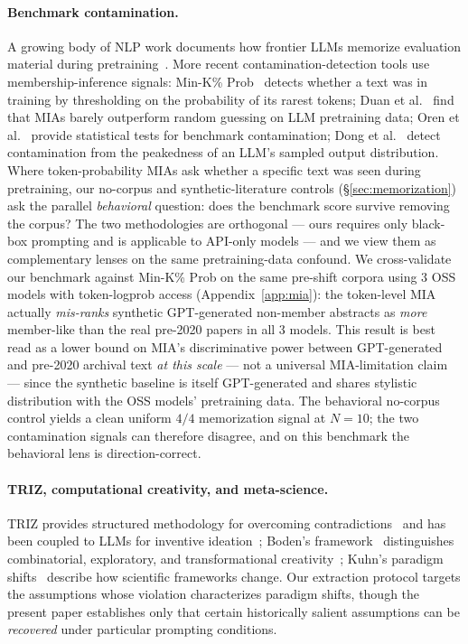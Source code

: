 \documentclass[11pt]{article}
\begin{document}
\paragraph{Benchmark contamination.}
A growing body of NLP work documents how frontier LLMs memorize evaluation material during pretraining~\cite{roberts2023contamination,golchin2024timetravel,magar2022exploitation,sainz2023nlp}. More recent contamination-detection tools use membership-inference signals: Min-K\% Prob~\cite{shi2024minkpct} detects whether a text was in training by thresholding on the probability of its rarest tokens; Duan et al.~\cite{duan2024mia} find that MIAs barely outperform random guessing on LLM pretraining data; Oren et al.~\cite{oren2024provable} provide statistical tests for benchmark contamination; Dong et al.~\cite{dong2024leakage} detect contamination from the peakedness of an LLM's sampled output distribution. Where token-probability MIAs ask whether a specific text was seen during pretraining, our no-corpus and synthetic-literature controls (\S\ref{sec:memorization}) ask the parallel \emph{behavioral} question: does the benchmark score survive removing the corpus? The two methodologies are orthogonal --- ours requires only black-box prompting and is applicable to API-only models --- and we view them as complementary lenses on the same pretraining-data confound. We cross-validate our benchmark against Min-K\% Prob on the same pre-shift corpora using 3 OSS models with token-logprob access (Appendix~\ref{app:mia}): the token-level MIA actually \emph{mis-ranks} synthetic GPT-generated non-member abstracts as \emph{more} member-like than the real pre-2020 papers in all 3 models. This result is best read as a lower bound on MIA's discriminative power between GPT-generated and pre-2020 archival text \emph{at this scale} --- not a universal MIA-limitation claim --- since the synthetic baseline is itself GPT-generated and shares stylistic distribution with the OSS models' pretraining data. The behavioral no-corpus control yields a clean uniform $4/4$ memorization signal at $N=10$; the two contamination signals can therefore disagree, and on this benchmark the behavioral lens is direction-correct.

\paragraph{TRIZ, computational creativity, and meta-science.}
TRIZ provides structured methodology for overcoming contradictions~\cite{altshuller1984creativity} and has been coupled to LLMs for inventive ideation~\cite{jiang2024autotriz}; Boden's framework~\cite{boden2004creative} distinguishes combinatorial, exploratory, and transformational creativity~\cite{schapiro2025transformational}; Kuhn's paradigm shifts~\cite{kuhn1962structure} describe how scientific frameworks change. Our extraction protocol targets the assumptions whose violation characterizes paradigm shifts, though the present paper establishes only that certain historically salient assumptions can be \emph{recovered} under particular prompting conditions.
\end{document}
